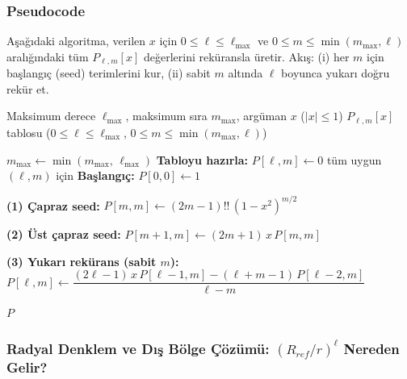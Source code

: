 \subsubsection{Pseudocode}

Aşağıdaki algoritma, verilen $x$ için
$0\le \ell \le \ell_{\max}$ ve $0\le m\le \min(m_{\max},\ell)$ aralığındaki
tüm $P_{\ell,m}[x]$ değerlerini reküransla üretir.
Akış: (i) her $m$ için başlangıç (seed) terimlerini kur,
(ii) sabit $m$ altında $\ell$ boyunca yukarı doğru rekür et.

\begin{algorithm}[H]
\caption{Associated Legendre $P_{\ell,m}[x]$ Rekürsif Hesabı (fazsız tanım)}
\begin{algorithmic}[1]
\REQUIRE Maksimum derece $\ell_{\max}$, maksimum sıra $m_{\max}$, argüman $x$ \;($|x|\le 1$)
\ENSURE $P_{\ell,m}[x]$ tablosu \;($0\le \ell \le \ell_{\max}$, $0\le m\le \min(m_{\max},\ell)$)

\STATE $m_{\max} \leftarrow \min(m_{\max},\,\ell_{\max})$
\STATE \textbf{Tabloyu hazırla:} $P[\ell,m] \leftarrow 0$ \;\; tüm uygun $(\ell,m)$ için
\STATE \textbf{Başlangıç:} $P[0,0] \leftarrow 1$


    \STATE \textbf{(1) Çapraz seed:} $P[m,m] \leftarrow (2m-1)!!\,(1-x^2)^{m/2}$

        \STATE \textbf{(2) Üst çapraz seed:} $P[m+1,m] \leftarrow (2m+1)\,x\,P[m,m]$
    \ENDIF

        \STATE \textbf{(3) Yukarı rekürans (sabit $m$):}
            \STATE $P[\ell,m] \leftarrow
            \dfrac{(2\ell-1)\,x\,P[\ell-1,m] - (\ell+m-1)\,P[\ell-2,m]}{\ell-m}$
        \ENDFOR
    \ENDIF

\ENDFOR

\RETURN $P$
\end{algorithmic}
\end{algorithm}





\newpage
\subsubsection{Radyal Denklem ve Dış Bölge Çözümü: $(R_{ref}/r)^\ell$ Nereden Gelir?}
\label{subsubsec:radial_solution}

